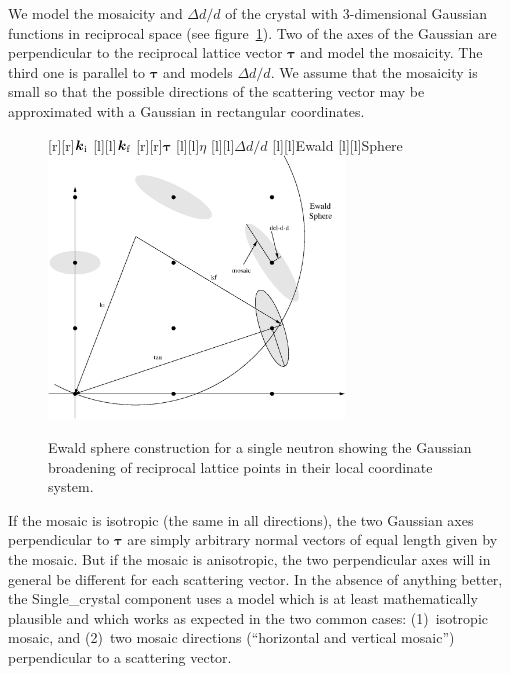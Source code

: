 We model the mosaicity and $\Delta d/d$ of the crystal with
3-dimensional Gaussian functions in reciprocal space (see
figure~\ref{fig:crystal-reciprocal-space}). Two of the axes of the
Gaussian are perpendicular to the reciprocal lattice vector $\boldsymbol{\tau}$ and model
the mosaicity. The third one is parallel to $\boldsymbol{\tau}$ and models
$\Delta d/d$. We assume that the
mosaicity is small so that the possible directions of the scattering
vector may be approximated with a Gaussian in rectangular
coordinates.
\begin{figure}[t]
  \begin{center}
    [r][r]{$\boldsymbol{k}_{\rm i}$}
    [l][l]{$\boldsymbol{k}_{\rm f}$}
    [r][r]{$\boldsymbol{\tau}$}
    [l][l]{$\eta$}
    [l][l]{$\Delta d/d$}
    [l][l]{Ewald}
    [l][l]{Sphere}
    \includegraphics[width=0.7\textwidth]{figures/recip_space3.eps}
  \end{center}
\caption{Ewald sphere construction for a single neutron showing the
    Gaussian broadening of reciprocal lattice points in their local
    coordinate system.}
\label{fig:crystal-reciprocal-space}
\end{figure}

If the mosaic is isotropic (the same in all directions), the two
Gaussian axes perpendicular to $\boldsymbol{\tau}$ are simply arbitrary
normal vectors of equal length given by the mosaic. But if the mosaic
is anisotropic, the two perpendicular axes will in general be different
for each scattering vector. In the absence of anything better, the
Single\_crystal component uses a model which is at least mathematically
plausible and which works as expected in the two common cases:
(1)~isotropic mosaic, and (2)~two mosaic directions (``horizontal and
vertical mosaic'') perpendicular to a scattering vector.

